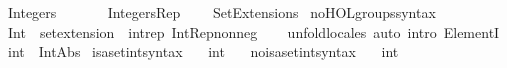 %
\begin{isabellebody}%
%
%
\isadelimdocument
%
\endisadelimdocument
%
\isatagdocument
%
\isamarkuptrue%
%
\endisatagdocument
{\isafolddocument}%
%
\isadelimdocument
%
\endisadelimdocument
%
\isadelimtheory
%
\endisadelimtheory
%
\isatagtheory
{}\isamarkupfalse%
\ Integers\isanewline
\ \ \isanewline
\ \ \ \ Integers{\isacharunderscore}{\kern0pt}Rep\isanewline
\ \ \ \ Set{\isacharunderscore}{\kern0pt}Extensions\isanewline
{}%
\endisatagtheory
{\isafoldtheory}%
%
\isadelimtheory
\isanewline
%
\endisadelimtheory
\isanewline
{}\isamarkupfalse%
\ no{\isacharunderscore}{\kern0pt}HOL{\isacharunderscore}{\kern0pt}groups{\isacharunderscore}{\kern0pt}syntax%
\isadelimdocument
%
\endisadelimdocument
%
\isatagdocument
%
\isamarkuptrue%
%
\endisatagdocument
{\isafolddocument}%
%
\isadelimdocument
%
\endisadelimdocument
{}\isamarkupfalse%
\ Int\ {\isacharcolon}{\kern0pt}\ set{\isacharunderscore}{\kern0pt}extension\ {\isasymnat}\ int{\isacharunderscore}{\kern0pt}rep\ Int{\isacharunderscore}{\kern0pt}Rep{\isacharunderscore}{\kern0pt}nonneg\isanewline
%
\isadelimproof
\ \ %
\endisadelimproof
%
\isatagproof
{}\isamarkupfalse%
\ unfold{\isacharunderscore}{\kern0pt}locales\ {\isacharparenleft}{\kern0pt}auto\ intro{\isacharcolon}{\kern0pt}\ ElementI{\isacharparenright}{\kern0pt}%
\endisatagproof
{\isafoldproof}%
%
\isadelimproof
\isanewline
%
\endisadelimproof
\isanewline
{}\isamarkupfalse%
\ {\isachardoublequoteopen}int\ {\isasymequiv}\ Int{\isachardot}{\kern0pt}Abs{\isachardoublequoteclose}\isanewline
\isanewline
{}\isamarkupfalse%
\ isa{\isacharunderscore}{\kern0pt}set{\isacharunderscore}{\kern0pt}int{\isacharunderscore}{\kern0pt}syntax\ \ \isamarkupfalse%
\ int\ {\isacharparenleft}{\kern0pt}{\isachardoublequoteopen}{\isasymint}{\isachardoublequoteclose}{\isacharparenright}{\kern0pt}\ \isamarkupfalse%
\isanewline
{}\isamarkupfalse%
\ no{\isacharunderscore}{\kern0pt}isa{\isacharunderscore}{\kern0pt}set{\isacharunderscore}{\kern0pt}int{\isacharunderscore}{\kern0pt}syntax\ \ \isamarkupfalse%
\ int\ {\isacharparenleft}{\kern0pt}{\isachardoublequoteopen}{\isasymint}{\isachardoublequoteclose}{\isacharparenright}{\kern0pt}\ \isamarkupfalse%

\end{isabellebody}

